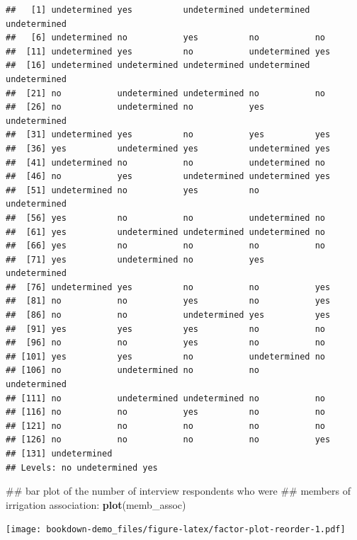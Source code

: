 \documentclass[]{book}
\newenvironment{Shaded}{\begin{snugshade}}{\end{snugshade}}
\newcommand{\KeywordTok}[1]{\textcolor[rgb]{0.13,0.29,0.53}{\textbf{#1}}}
\newcommand{\NormalTok}[1]{#1}
\begin{document}
\begin{verbatim}
##   [1] undetermined yes          undetermined undetermined undetermined
##   [6] undetermined no           yes          no           no          
##  [11] undetermined yes          no           undetermined yes         
##  [16] undetermined undetermined undetermined undetermined undetermined
##  [21] no           undetermined undetermined no           no          
##  [26] no           undetermined no           yes          undetermined
##  [31] undetermined yes          no           yes          yes         
##  [36] yes          undetermined yes          undetermined yes         
##  [41] undetermined no           no           undetermined no          
##  [46] no           yes          undetermined undetermined yes         
##  [51] undetermined no           yes          no           undetermined
##  [56] yes          no           no           undetermined no          
##  [61] yes          undetermined undetermined undetermined no          
##  [66] yes          no           no           no           no          
##  [71] yes          undetermined no           yes          undetermined
##  [76] undetermined yes          no           no           yes         
##  [81] no           no           yes          no           yes         
##  [86] no           no           undetermined yes          yes         
##  [91] yes          yes          yes          no           no          
##  [96] no           no           yes          no           no          
## [101] yes          yes          no           undetermined no          
## [106] no           undetermined no           no           undetermined
## [111] no           undetermined undetermined no           no          
## [116] no           no           yes          no           no          
## [121] no           no           no           no           no          
## [126] no           no           no           no           yes         
## [131] undetermined
## Levels: no undetermined yes
\end{verbatim}

\begin{Shaded}
\begin{Highlighting}[]
\NormalTok{## bar plot of the number of interview respondents who were}
\NormalTok{## members of irrigation association:}
\KeywordTok{plot}\NormalTok{(memb_assoc)}
\end{Highlighting}
\end{Shaded}

\texttt{[image: bookdown-demo\_files/figure-latex/factor-plot-reorder-1.pdf]}
\end{document}
